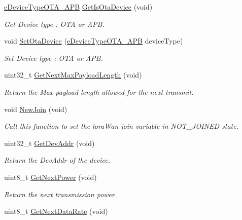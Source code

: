 \begin{DoxyCompactItemize}
\mbox{\hyperlink{_define_8h_a1e0a07faefc3dd68bbdd06f7c856cc74}{e\+Device\+Type\+O\+T\+A\+\_\+\+A\+PB}} \mbox{\hyperlink{class_lora_wan_object_a15850f3c7c700edaed5f780d34bff4a8}{Get\+Is\+Ota\+Device}} (void)
\begin{DoxyCompactList}\small\item\em Get Device type \+: O\+TA or A\+PB. \end{DoxyCompactList}\item 
void \mbox{\hyperlink{class_lora_wan_object_a0a8c97531cab1e5610e54f9c1c416185}{Set\+Ota\+Device}} (\mbox{\hyperlink{_define_8h_a1e0a07faefc3dd68bbdd06f7c856cc74}{e\+Device\+Type\+O\+T\+A\+\_\+\+A\+PB}} device\+Type)
\begin{DoxyCompactList}\small\item\em Set Device type \+: O\+TA or A\+PB. \end{DoxyCompactList}\item 
uint32\+\_\+t \mbox{\hyperlink{class_lora_wan_object_a5a43bf270bf1b0b3642d7989d8746023}{Get\+Next\+Max\+Payload\+Length}} (void)
\begin{DoxyCompactList}\small\item\em Return the Max payload length allowed for the next transmit. \end{DoxyCompactList}\item 
void \mbox{\hyperlink{class_lora_wan_object_adf904fdda3d554b8759258be6d93d902}{New\+Join}} (void)
\begin{DoxyCompactList}\small\item\em Call this function to set the lora\+Wan join variable in N\+O\+T\+\_\+\+J\+O\+I\+N\+ED state. \end{DoxyCompactList}\item 
uint32\+\_\+t \mbox{\hyperlink{class_lora_wan_object_ac6cb84ba9ccb3197382280abc72d453c}{Get\+Dev\+Addr}} (void)
\begin{DoxyCompactList}\small\item\em Return the Dev\+Addr of the device. \end{DoxyCompactList}\item 
uint8\+\_\+t \mbox{\hyperlink{class_lora_wan_object_ac833ad6ffd937e093709f6fc309e2276}{Get\+Next\+Power}} (void)
\begin{DoxyCompactList}\small\item\em Return the next transmission power. \end{DoxyCompactList}\item 
uint8\+\_\+t \mbox{\hyperlink{class_lora_wan_object_a4e9211e749e9d12bc6a044a7381efcb8}{Get\+Next\+Data\+Rate}} (void)

\end{DoxyCompactItemize}
